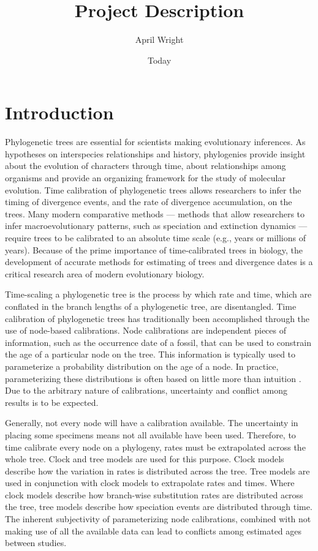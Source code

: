 \documentclass[]{article}
\begin{document}
\title{Project Description}
\author{April Wright}
\date{Today}
\maketitle

\section*{Introduction}
    Phylogenetic trees are essential for scientists making evolutionary inferences. As hypotheses on interspecies relationships and history, phylogenies provide insight about the evolution of characters through time, about relationships among organisms and provide an organizing framework for the study of molecular evolution. Time calibration of phylogenetic trees allows researchers to infer the timing of divergence events, and the rate of divergence accumulation, on the trees. Many modern comparative methods --- methods that allow researchers to infer macroevolutionary patterns, such as speciation and extinction dynamics --- require trees to be calibrated to an absolute time scale (e.g., years or millions of years). Because of the prime importance of time-calibrated trees in biology, the development of accurate methods for estimating of trees and divergence dates is a critical research area of modern evolutionary biology. \par
    Time-scaling a phylogenetic tree is the process by which rate and time, which are conflated in the branch lengths of a phylogenetic tree, are disentangled. Time calibration of phylogenetic trees has traditionally been accomplished through the use of node-based calibrations. Node calibrations are independent pieces of information, such as the occurrence date of a fossil, that can be used to constrain the age of a particular node on the tree. This information is typically used to parameterize a probability distribution on the age of a node.  In practice, parameterizing these distributions is often based on little more than intuition \citep{Heath01032012, Heath22072014}. Due to the arbitrary nature of calibrations, uncertainty and conflict among results is to be expected.  \par
Generally, not every node will have a calibration available. The uncertainty in placing some specimens means not all available have been used. Therefore, to time calibrate every node on a phylogeny, rates must be extrapolated across the whole tree. Clock and tree models are used for this purpose. Clock models describe how the variation in rates is distributed across the tree. Tree models are used in conjunction with clock models to extrapolate rates and times. Where clock models describe how branch-wise substitution rates are distributed across the tree, tree models describe how speciation events are distributed through time. The inherent subjectivity of parameterizing node calibrations, combined with not making use of all the available data can lead to conflicts among estimated ages between studies. \par
\end{document}
